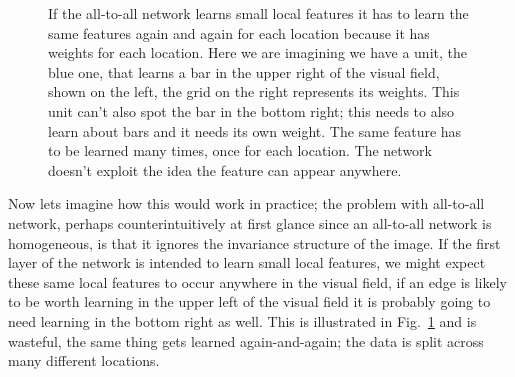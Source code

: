 \documentclass[12pt]{article}
\begin{document}
\begin{figure}
\begin{center}
\begin{tikzpicture}[neuron/.style={circle,draw,thick,minimum size=6mm,inner sep=0pt,fill=red!25}]
\end{tikzpicture}
\end{center}
\caption{If the all-to-all network learns small local features it has
  to learn the same features again and again for each location because
  it has weights for each location. Here we are imagining we have a
  unit, the blue one, that learns a bar in the upper right of the
  visual field, shown on the left, the grid on the right represents
  its weights. This unit can't also spot the bar in the bottom right;
  this needs to also learn about bars and it needs its own weight. The
  same feature has to be learned many times, once for each
  location. The network doesn't exploit the idea the feature can
  appear anywhere.\label{fig:all2all}}
\end{figure}

Now lets imagine how this would work in practice; the problem with
all-to-all network, perhaps counterintuitively at first glance since
an all-to-all network is homogeneous, is that it ignores the
invariance structure of the image. If the first layer of the network
is intended to learn small local features, we might expect these same
local features to occur anywhere in the visual field, if an edge is
likely to be worth learning in the upper left of the visual field it
is probably going to need learning in the bottom right as well. This
is illustrated in Fig.~\ref{fig:all2all} and is wasteful, the same
thing gets learned again-and-again; the data is split across many
different locations.
\end{document}
